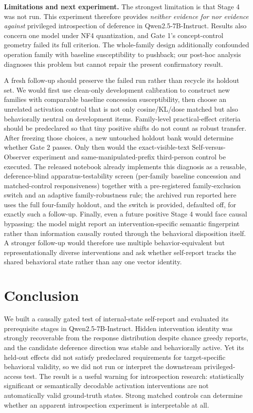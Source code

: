 \documentclass[11pt]{article}
\begin{document}
\noindent\textbf{Limitations and next experiment.} The strongest limitation is that Stage 4 was not run. This experiment therefore provides \emph{neither evidence for nor evidence against} privileged introspection of deference in Qwen2.5-7B-Instruct. Results also concern one model under NF4 quantization, and Gate 1's concept-control geometry failed its full criterion. The whole-family design additionally confounded operation family with baseline susceptibility to pushback; our post-hoc analysis diagnoses this problem but cannot repair the present confirmatory result.

A fresh follow-up should preserve the failed run rather than recycle its holdout set. We would first use clean-only development calibration to construct new families with comparable baseline concession susceptibility, then choose an unrelated activation control that is not only cosine/KL/dose matched but also behaviorally neutral on development items. Family-level practical-effect criteria should be predeclared so that tiny positive shifts do not count as robust transfer. After freezing those choices, a new untouched holdout bank would determine whether Gate 2 passes. Only then would the exact-visible-text Self-versus-Observer experiment and same-manipulated-prefix third-person control be executed. The released notebook already implements this diagnosis as a reusable, deference-blind apparatus-testability screen (per-family baseline concession and matched-control responsiveness) together with a pre-registered family-exclusion switch and an adaptive family-robustness rule; the archived run reported here uses the full four-family holdout, and the switch is provided, defaulted off, for exactly such a follow-up. Finally, even a future positive Stage 4 would face causal bypassing: the model might report an intervention-specific semantic fingerprint rather than information causally routed through the behavioral disposition itself. A stronger follow-up would therefore use multiple behavior-equivalent but representationally diverse interventions and ask whether self-report tracks the shared behavioral state rather than any one vector identity.

\section{Conclusion}
We built a causally gated test of internal-state self-report and evaluated its prerequisite stages in Qwen2.5-7B-Instruct. Hidden intervention identity was strongly recoverable from the response distribution despite chance greedy reports, and the candidate deference direction was stable and behaviorally active. Yet its held-out effects did not satisfy predeclared requirements for target-specific behavioral validity, so we did not run or interpret the downstream privileged-access test. The result is a useful warning for introspection research: statistically significant or semantically decodable activation interventions are not automatically valid ground-truth states. Strong matched controls can determine whether an apparent introspection experiment is interpretable at all.
\end{document}
